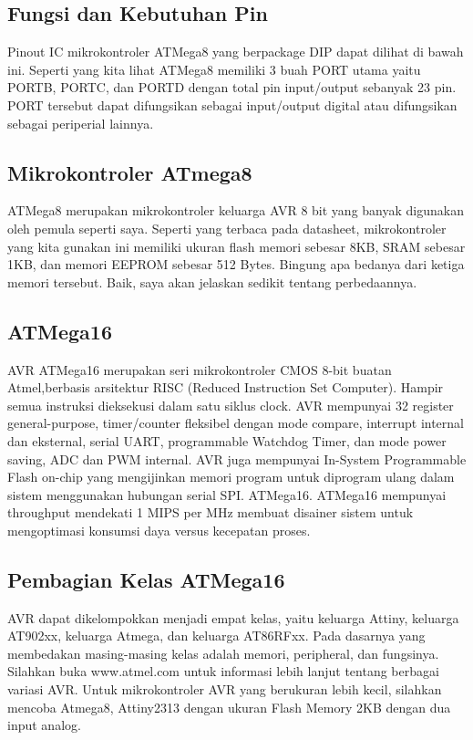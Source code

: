 	\subsection{Fungsi dan Kebutuhan Pin}
		Pinout IC mikrokontroler ATMega8 yang berpackage DIP dapat dilihat di bawah ini.
		Seperti yang kita lihat ATMega8 memiliki 3 buah PORT utama yaitu PORTB, PORTC, dan PORTD dengan total pin input/output sebanyak 23 pin. PORT tersebut dapat difungsikan sebagai input/output digital atau difungsikan sebagai periperial lainnya.
		
	\subsection{Mikrokontroler ATmega8}
		ATMega8 merupakan mikrokontroler keluarga AVR 8 bit yang banyak digunakan oleh pemula seperti saya. Seperti yang terbaca pada datasheet, mikrokontroler yang kita gunakan ini memiliki ukuran flash memori sebesar 8KB, SRAM sebesar 1KB, dan memori EEPROM sebesar 512 Bytes. Bingung apa bedanya dari ketiga memori tersebut. Baik, saya akan jelaskan sedikit tentang perbedaannya.
		
	\subsection{ATMega16}
		AVR ATMega16 merupakan seri mikrokontroler CMOS 8-bit buatan Atmel,berbasis arsitektur RISC (Reduced Instruction Set Computer). Hampir semua instruksi dieksekusi dalam satu siklus clock. AVR mempunyai 32 register general-purpose, timer/counter fleksibel dengan mode compare, interrupt internal dan eksternal, serial UART, programmable Watchdog Timer, dan mode power saving, ADC dan PWM internal. AVR juga mempunyai In-System Programmable Flash on-chip yang mengijinkan memori program untuk diprogram ulang dalam sistem menggunakan hubungan serial SPI. ATMega16. ATMega16 mempunyai throughput mendekati 1 MIPS per MHz membuat disainer sistem untuk mengoptimasi konsumsi daya versus kecepatan proses.
	\subsection{Pembagian Kelas ATMega16}
		AVR dapat dikelompokkan menjadi empat kelas, yaitu keluarga Attiny, keluarga AT902xx, keluarga Atmega, dan keluarga AT86RFxx. Pada dasarnya yang membedakan masing-masing kelas adalah memori, peripheral, dan fungsinya. Silahkan buka www.atmel.com untuk informasi lebih lanjut tentang berbagai variasi AVR. Untuk mikrokontroler AVR yang berukuran lebih kecil, silahkan mencoba Atmega8, Attiny2313 dengan ukuran Flash Memory 2KB dengan dua input analog.

